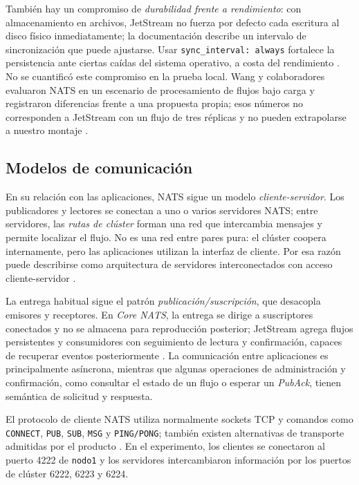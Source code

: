 \documentclass[12pt,a4paper]{article}
\begin{document}
También hay un compromiso de \emph{durabilidad frente a rendimiento}: con almacenamiento en archivos, JetStream no fuerza por defecto cada escritura al disco físico inmediatamente; la documentación describe un intervalo de sincronización que puede ajustarse. Usar \texttt{sync\_interval: always} fortalece la persistencia ante ciertas caídas del sistema operativo, a costa del rendimiento \cite{natsreplication}. No se cuantificó este compromiso en la prueba local. Wang y colaboradores evaluaron NATS en un escenario de procesamiento de flujos bajo carga y registraron diferencias frente a una propuesta propia; esos números no corresponden a JetStream con un flujo de tres réplicas y no pueden extrapolarse a nuestro montaje \cite{wang2025}.

\subsection{Modelos de comunicación}
En su relación con las aplicaciones, NATS sigue un modelo \emph{cliente-servidor}. Los publicadores y lectores se conectan a uno o varios servidores NATS; entre servidores, las \emph{rutas de clúster} forman una red que intercambia mensajes y permite localizar el flujo. No es una red entre pares pura: el clúster coopera internamente, pero las aplicaciones utilizan la interfaz de cliente. Por esa razón puede describirse como arquitectura de servidores interconectados con acceso cliente-servidor \cite{natsclustering}.

La entrega habitual sigue el patrón \emph{publicación/suscripción}, que desacopla emisores y receptores. En \emph{Core NATS}, la entrega se dirige a suscriptores conectados y no se almacena para reproducción posterior; JetStream agrega flujos persistentes y consumidores con seguimiento de lectura y confirmación, capaces de recuperar eventos posteriormente \cite{natsjetstream}. La comunicación entre aplicaciones es principalmente asíncrona, mientras que algunas operaciones de administración y confirmación, como consultar el estado de un flujo o esperar un \emph{PubAck}, tienen semántica de solicitud y respuesta.

El protocolo de cliente NATS utiliza normalmente sockets TCP y comandos como \texttt{CONNECT}, \texttt{PUB}, \texttt{SUB}, \texttt{MSG} y \texttt{PING/PONG}; también existen alternativas de transporte admitidas por el producto \cite{natsprotocol}. En el experimento, los clientes se conectaron al puerto 4222 de \texttt{nodo1} y los servidores intercambiaron información por los puertos de clúster 6222, 6223 y 6224.
\end{document}
